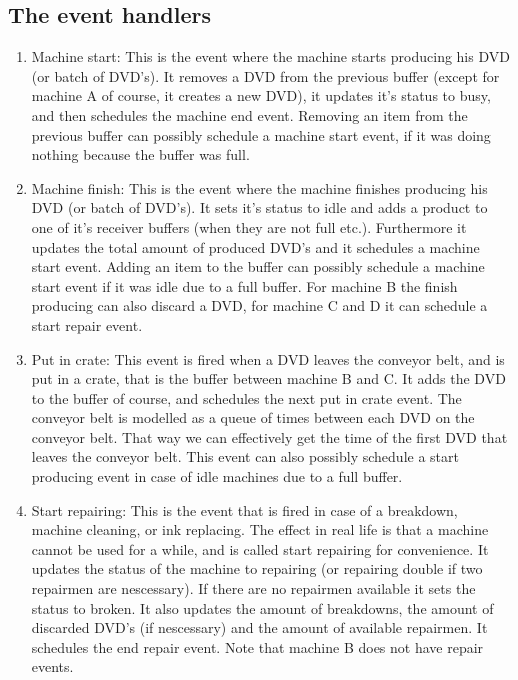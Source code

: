 \documentclass{article}
\begin{document}
\subsection{The event handlers}
\begin{enumerate}
    \item Machine start:
        This is the event where the machine starts producing his DVD (or batch of DVD's).
        It removes a DVD from the previous buffer
        (except for machine A of course, it creates a new DVD),
        it updates it's status to busy, and then schedules the machine end event.
        Removing an item from the previous buffer can possibly schedule a machine start event, if it was doing nothing because the buffer was full.
    \item Machine finish:
        This is the event where the machine finishes producing his DVD (or batch of DVD's).
        It sets it's status to idle and adds a product to one of it's receiver buffers (when they are not full etc.).
        Furthermore it updates the total amount of produced DVD's and it schedules a machine start event.
        Adding an item to the buffer can possibly schedule a machine start event if it was idle due to a full buffer.
        For machine B the finish producing can also discard a DVD,
        for machine C and D it can schedule a start repair event.

    \item Put in crate:
        This event is fired when a DVD leaves the conveyor belt, and is put in a crate, that is the buffer between machine B and C.
        It adds the DVD to the buffer of course, and schedules the next put in crate event.
        The conveyor belt is modelled as a queue of times between each DVD on the conveyor belt. That way we can effectively get the time of the first DVD that leaves the conveyor belt.
        This event can also possibly schedule a start producing event in case of idle machines due to a full buffer.

    \item Start repairing:
        This is the event that is fired in case of a breakdown, machine cleaning, or ink replacing. The effect in real life is that a machine cannot be used for a while, and is called start repairing for convenience.
        It updates the status of the machine to repairing
        (or repairing double if two repairmen are nescessary).
        If there are no repairmen available it sets the status to broken.
        It also updates the amount of breakdowns, the amount of discarded DVD's (if nescessary) and the amount of available repairmen.
        It schedules the end repair event.
        Note that machine B does not have repair events.


\end{enumerate}
\end{document}
